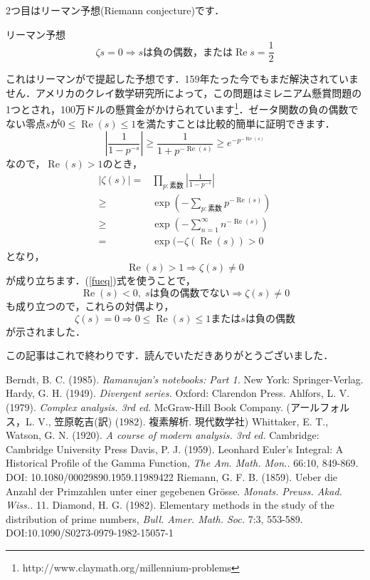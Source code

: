 \documentclass[./main]{subfile}
\begin{document}
2つ目はリーマン予想(Riemann conjecture)です．
\begin{itembox}[l]{リーマン予想}
\[
\zeta{s}=0\Rightarrow s\text{は負の偶数，または}\operatorname{Re}s=\frac{1}{2}
\]
\end{itembox}
これはリーマンが\cite{APG}で提起した予想です．159年たった今でもまだ解決されていません．アメリカのクレイ数学研究所によって，この問題はミレニアム懸賞問題の1つとされ，100万ドルの懸賞金がかけられています\footnote{http://www.claymath.org/millennium-problems}．ゼータ関数の負の偶数でない零点$s$が$0\leq \operatorname{Re}(s)\leq 1$を満たすことは比較的簡単に証明できます．
\[
\left|\frac{1}{1-p^{-s}}\right|\geq \frac{1}{1+p^{-\operatorname{Re}(s)}}\geq e^{-p^{-\operatorname{Re}(s)}}
\]
なので，$\operatorname{Re}(s)>1$のとき，
\begin{align*}
\left|\zeta(s)\right|=&\prod_{p:\text{素数}}\left|\frac{1}{1-p^{-s}}\right|\\
\geq&\exp\left(-\sum_{p:\text{素数}}p^{-\operatorname{Re}(s)}\right)\\
\geq&\exp\left(-\sum_{n=1}^{\infty}n^{-\operatorname{Re}(s)}\right)\\
=&\exp(-\zeta(\operatorname{Re}(s))>0
\end{align*}
となり，
\[
\operatorname{Re}(s)>1\Rightarrow\zeta(s)\neq 0
\]
が成り立ちます．(\ref{fueq})式を使うことで，
\[
\operatorname{Re}(s)<0,\;s\text{は負の偶数でない}\Rightarrow\zeta(s)\neq 0
\]
も成り立つので，これらの対偶より，
\[
\zeta(s)=0\Rightarrow 0\leq\operatorname{Re}(s)\leq 1\text{または}s\text{は負の偶数}
\]
が示されました．\vspace{\baselineskip}

この記事はこれで終わりです．読んでいただきありがとうございました．

\begin{thebibliography}{9}
Berndt, B. C. (1985). {\it Ramanujan's notebooks: Part 1.} New York: Springer-Verlag.
Hardy, G. H. (1949). {\it Divergent series.} Oxford: Clarendon Press.
Ahlfors, L. V. (1979). {\it Complex analysis. 3rd ed.} McGraw-Hill Book Company. (アールフォルス，L. V., 笠原乾吉(訳) (1982). 複素解析. 現代数学社)
Whittaker, E. T., Watson, G. N. (1920). {\it A course of modern analysis. 3rd ed.} Cambridge: Cambridge University Press
 Davis, P. J. (1959). Leonhard Euler's Integral: A Historical Profile of the Gamma Function, {\it The Am. Math. Mon..} 66:10, 849-869. DOI: 10.1080/00029890.1959.11989422
Riemann, G. F. B. (1859). Ueber die Anzahl der Primzahlen unter einer gegebenen Gr\"osse. {\it Monats. Preuss. Akad. Wiss..} 11.
Diamond, H. G. (1982). Elementary methods in the study of the distribution of prime numbers, {\it Bull. Amer. Math. Soc.} 7:3, 553-589. DOI:10.1090/S0273-0979-1982-15057-1
\end{thebibliography}
\end{document}
